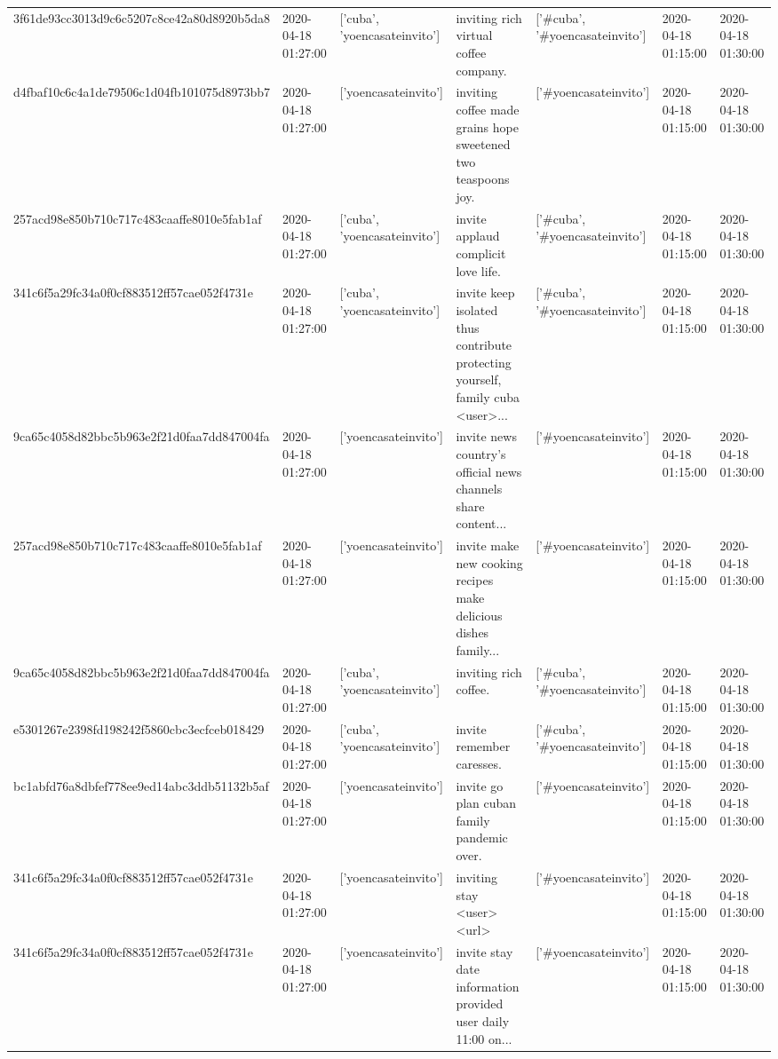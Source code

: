 \begin{tabular}{lllllll}
3f61de93cc3013d9c6c5207c8ce42a80d8920b5da8 & 2020-04-18 01:27:00 & ['cuba', 'yoencasateinvito'] & inviting rich virtual coffee company. & ['#cuba', '#yoencasateinvito'] & 2020-04-18 01:15:00 & 2020-04-18 01:30:00 \\
d4fbaf10c6c4a1de79506c1d04fb101075d8973bb7 & 2020-04-18 01:27:00 & ['yoencasateinvito'] & inviting coffee made grains hope sweetened two teaspoons joy. & ['#yoencasateinvito'] & 2020-04-18 01:15:00 & 2020-04-18 01:30:00 \\
257acd98e850b710c717c483caaffe8010e5fab1af & 2020-04-18 01:27:00 & ['cuba', 'yoencasateinvito'] & invite applaud complicit love life. & ['#cuba', '#yoencasateinvito'] & 2020-04-18 01:15:00 & 2020-04-18 01:30:00 \\
341c6f5a29fc34a0f0cf883512ff57cae052f4731e & 2020-04-18 01:27:00 & ['cuba', 'yoencasateinvito'] & invite keep isolated thus contribute protecting yourself, family cuba <user>... & ['#cuba', '#yoencasateinvito'] & 2020-04-18 01:15:00 & 2020-04-18 01:30:00 \\
9ca65c4058d82bbc5b963e2f21d0faa7dd847004fa & 2020-04-18 01:27:00 & ['yoencasateinvito'] & invite news country's official news channels share content... & ['#yoencasateinvito'] & 2020-04-18 01:15:00 & 2020-04-18 01:30:00 \\
257acd98e850b710c717c483caaffe8010e5fab1af & 2020-04-18 01:27:00 & ['yoencasateinvito'] & invite make new cooking recipes make delicious dishes family... & ['#yoencasateinvito'] & 2020-04-18 01:15:00 & 2020-04-18 01:30:00 \\
9ca65c4058d82bbc5b963e2f21d0faa7dd847004fa & 2020-04-18 01:27:00 & ['cuba', 'yoencasateinvito'] & inviting rich coffee. & ['#cuba', '#yoencasateinvito'] & 2020-04-18 01:15:00 & 2020-04-18 01:30:00 \\
e5301267e2398fd198242f5860cbc3ecfceb018429 & 2020-04-18 01:27:00 & ['cuba', 'yoencasateinvito'] & invite remember caresses. & ['#cuba', '#yoencasateinvito'] & 2020-04-18 01:15:00 & 2020-04-18 01:30:00 \\
bc1abfd76a8dbfef778ee9ed14abc3ddb51132b5af & 2020-04-18 01:27:00 & ['yoencasateinvito'] & invite go plan cuban family pandemic over. & ['#yoencasateinvito'] & 2020-04-18 01:15:00 & 2020-04-18 01:30:00 \\
341c6f5a29fc34a0f0cf883512ff57cae052f4731e & 2020-04-18 01:27:00 & ['yoencasateinvito'] & inviting stay <user> <url> & ['#yoencasateinvito'] & 2020-04-18 01:15:00 & 2020-04-18 01:30:00 \\
341c6f5a29fc34a0f0cf883512ff57cae052f4731e & 2020-04-18 01:27:00 & ['yoencasateinvito'] & invite stay date information provided user daily 11:00 on... & ['#yoencasateinvito'] & 2020-04-18 01:15:00 & 2020-04-18 01:30:00 \\

\end{tabular}
